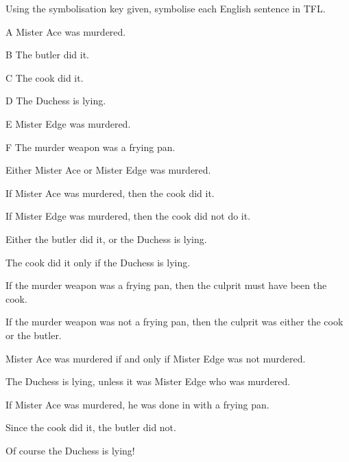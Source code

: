 \problempart Using the symbolisation key given, symbolise each English sentence in TFL.
\begin{ekey}
\item[A] Mister Ace was murdered.
\item[B] The butler did it.
\item[C] The cook did it.
\item[D] The Duchess is lying.
\item[E] Mister Edge was murdered.
\item[F] The murder weapon was a frying pan.
\end{ekey}
\begin{earg}
\item Either Mister Ace or Mister Edge was murdered.
\item[] 
\item If Mister Ace was murdered, then the cook did it.
\item[] 
\item If Mister Edge was murdered, then the cook did not do it.
\item[] 
\item Either the butler did it, or the Duchess is lying.
\item[] 
\item The cook did it only if the Duchess is lying.
\item[] 
\item If the murder weapon was a frying pan, then the culprit must have been the cook.
\item[] 
\item If the murder weapon was not a frying pan, then the culprit was either the cook or the butler.
\item[] 
\item Mister Ace was murdered if and only if Mister Edge was not murdered.
\item[] 
\item The Duchess is lying, unless it was Mister Edge who was murdered.
\item[] 
\item If Mister Ace was murdered, he was done in with a frying pan.
\item[] 
\item Since the cook did it, the butler did not.
\item[] 
\item Of course the Duchess is lying!
\item[] 
\end{earg}

